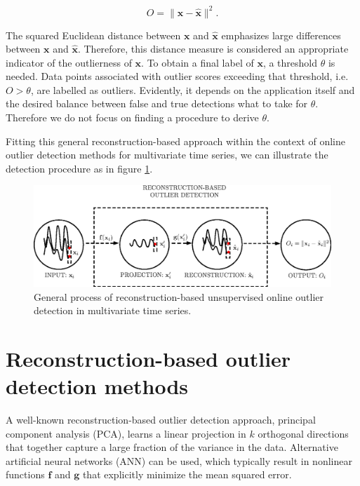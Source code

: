 \begin{equation}\label{eq:reconstruction_score}
 O = \|\mathbf{x} - \hat{\mathbf{x}}\|^2.
\end{equation}  

The squared Euclidean distance between $\mathbf{x}$ and $\hat{\mathbf{x}}$ emphasizes large differences between $\mathbf{x}$ and $\hat{\mathbf{x}}$. Therefore, this distance measure is considered an appropriate indicator of the outlierness of $\mathbf{x}$.
To obtain a final label of $\mathbf{x}$, a threshold $\theta$ is needed. Data points associated with outlier scores exceeding that threshold, i.e. $O > \theta$, are labelled as outliers. Evidently, it depends on the application itself and the desired balance between false and true detections what to take for $\theta$. Therefore we do not focus on finding a procedure to derive $\theta$.

Fitting this general reconstruction-based approach within the context of online outlier detection methods for multivariate time series, we can illustrate the detection procedure as in figure \ref{fig:reconstruction_reconstruction}.

\begin{figure}[h]
	\centering
	\vspace{0.25cm}
	\includegraphics[scale=0.85]{reconstruction-detection/reconstruction_outlierdetection_noexp}
	\caption{General process of reconstruction-based unsupervised online outlier detection in multivariate time series.}
	\label{fig:reconstruction_reconstruction}
\end{figure}

\newpage
\section{Reconstruction-based outlier detection methods}
\label{sec:reconstruction_methods}

A well-known reconstruction-based outlier detection approach, principal component analysis (PCA), learns a linear projection in $k$ orthogonal directions that together capture a large fraction of the variance in the data. Alternative artificial neural networks (ANN) can be used, which typically result in nonlinear functions $\mathbf{f}$ and $\mathbf{g}$ that explicitly minimize the mean squared error. 

